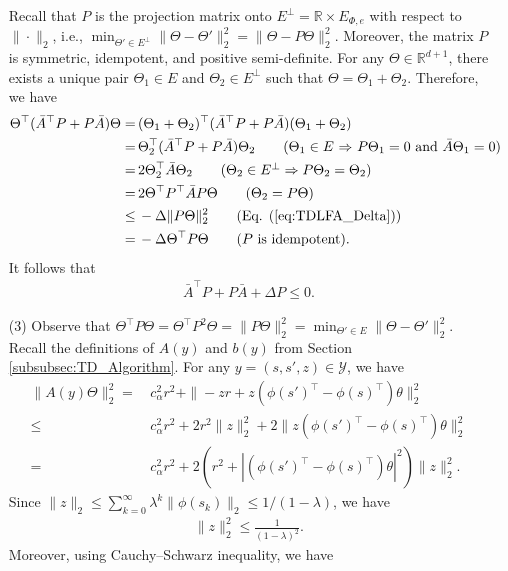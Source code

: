 \documentclass[11 pt]{article}
\begin{document}
\begin{enumerate}
		Recall that $P$ is the projection matrix onto $E^\perp=\mathbb{R}\times E_{\Phi,e}$ with respect to $\|\cdot\|_2$, i.e., $\min_{\Theta'\in E^\perp}\|\Theta-\Theta'\|_2^2=\|\Theta-P\Theta\|_2^2$. Moreover, the matrix $P$ is symmetric, idempotent, and positive semi-definite. For any $\Theta \in \mathbb{R}^{d+1}$, there exists a unique pair $\Theta_1\in E$ and $\Theta_2\in E^\perp$ such that $\Theta=\Theta_1+\Theta_2$. Therefore, we have
		\begin{align*}
			\Theta^\top (\bar{A}^\top P +P\bar{A})\Theta=\,&(\Theta_1+\Theta_2)^\top (\bar{A}^\top P +P\bar{A})(\Theta_1+\Theta_2)\\
			=\,&\Theta_2^\top (\bar{A}^\top P +P\bar{A})\Theta_2\tag{$\Theta_1 \in E$ $\Rightarrow$ $P\Theta_1=0$ and $\bar{A}\Theta_1=0$}\\
			=\,&2\Theta_2^\top \bar{A}\Theta_2\tag{$\Theta_2 \in E^\perp\Rightarrow P\Theta_2 =\Theta_2$}\\
			=\,&2\Theta^\top P^\top \bar{A}P\Theta\tag{$\Theta_2=P\Theta$}\\
			\leq\,& -\Delta\|P\Theta\|_2^2\tag{Eq. (\ref{eq:TDLFA_Delta})}\\
			=\,& -\Delta\Theta^\top P\Theta\tag{$P$ is idempotent}.
		\end{align*}
		It follows that
		\begin{align*}
			\bar{A}^\top P+P\bar{A}+\Delta P\leq 0.
		\end{align*}
		\item [(3)] Observe that $\Theta^\top P\Theta=\Theta^\top P^2\Theta=\|P\Theta\|_2^2=\min_{\Theta'\in E}\|\Theta-\Theta'\|_2^2$. Recall the definitions of $A(y)$ and $b(y)$ from Section \ref{subsubsec:TD_Algorithm}. For any $y=(s,s',z)\in\mathcal{Y}$, we have
		\begin{align*}
			\|A(y)\Theta\|_2^2=\,&c_\alpha^2r^2+\|-zr+z\left(\phi(s')^\top - \phi(s)^\top \right)\theta\|_2^2\\
			\leq \,&c_\alpha^2r^2+2r^2\|z\|_2^2+2\|z\left(\phi(s')^\top - \phi(s)^\top \right)\theta\|_2^2\tag{$(a+b)^2\leq 2(a^2+b^2)$}\\
			=\,&c_\alpha^2r^2+2\left(r^2+|(\phi(s')^\top - \phi(s)^\top)\theta|^2\right)\|z\|_2^2.
		\end{align*}
		Since $\|z\|_2\leq \sum_{k=0}^\infty \lambda^k\|\phi(s_k)\|_2\leq 1/(1-\lambda)$, we have
		\begin{align*}
			\|z\|_2^2\leq \frac{1}{(1-\lambda)^2}.
		\end{align*}
		Moreover, using Cauchy–Schwarz inequality, we have
		\begin{align*}

\end{align*}
\end{enumerate}
\end{document}
